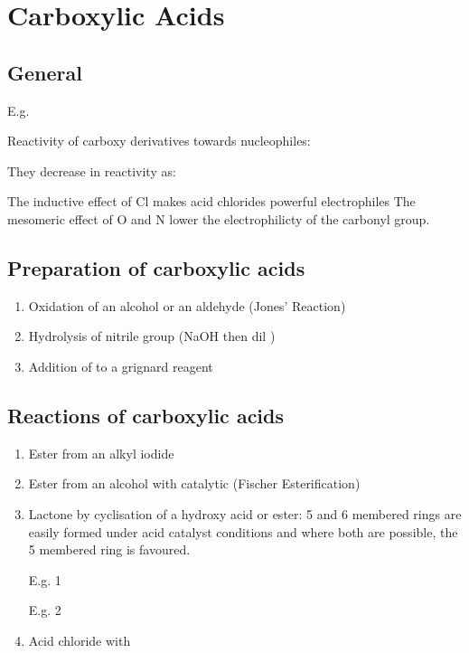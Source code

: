 \section{Carboxylic Acids}

\subsection{General}

E.g.

Reactivity of carboxy derivatives towards nucleophiles:

They decrease in reactivity as:

The inductive effect of Cl makes acid chlorides powerful electrophiles
The mesomeric effect of O and N lower the electrophilicty of the carbonyl group.

\subsection{Preparation of carboxylic acids}

\begin{enumerate}[label=\alph*)]

  \item Oxidation of an alcohol or an aldehyde (Jones' Reaction)

  \item Hydrolysis of nitrile group (NaOH then dil )

  \item Addition of  to a grignard reagent

\end{enumerate}


\subsection{Reactions of carboxylic acids}

\begin{enumerate}[label=\alph*)]

  \item Ester from an alkyl iodide

  \item Ester from an alcohol with catalytic  (Fischer Esterification)


  \item Lactone by cyclisation of a hydroxy acid or ester: 5 and 6 membered rings
    are easily formed under acid catalyst conditions and where both are possible,
    the 5 membered ring is favoured.

    E.g. 1

    E.g. 2

  \item Acid chloride with 

\end{enumerate}